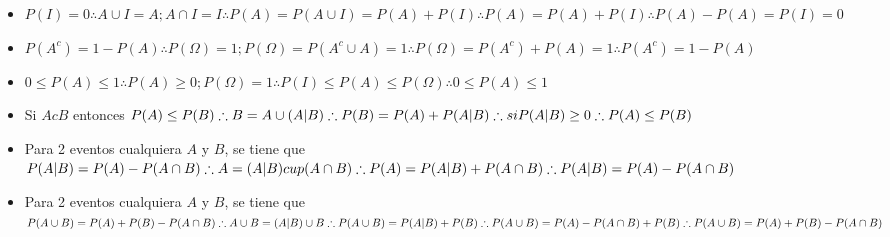 \documentclass[11pt,fleqn]{book} %
\numberwithin{equation}{section} %
\numberwithin{figure}{section} %
\numberwithin{table}{section} %
\begin{document}
\begin{itemize}
    \item $P(I) = 0 \therefore A \cup I = A; A \cap I = I \therefore P(A) = P(A \cup I) = P(A) + P(I) \therefore P(A) = P(A) + P(I) \therefore P(A) - P(A) = P(I) = 0$
    \item $P(A^{c})= 1 - P(A) \therefore P(\Omega) = 1; P(\Omega) = P(A^{c} \cup A) = 1 \therefore P(\Omega) = P(A^{c}) + P(A) = 1  \therefore P(A^{c})  = 1 - P(A)$
    \item $0 \leq P(A) \leq 1 \therefore P(A) \geq 0; P(\Omega) = 1 \therefore P(I) \leq P(A) \leq P(\Omega) \therefore 0 \leq P(A) \leq 1$
    \item Si $A c B$ entonces $P(A) \leq P(B) \therefore B = A \cup (A\arrowvert B) \therefore P(B) = P(A) + P(A\arrowvert B) \therefore si P(A\arrowvert B) \geq 0 \therefore P(A) \leq P(B)$
    \item Para 2 eventos cualquiera $A$ y $B$, se tiene que $P(A\arrowvert B) = P(A) - P(A \cap B) \therefore A = (A\arrowvert B) cup (A \cap B) \therefore P(A) = P(A\arrowvert B) + P(A \cap B) \therefore P(A\arrowvert B) = P(A) - P(A \cap B) $
    \item Para 2 eventos cualquiera $A$ y $B$, se tiene que $P(A\cup B) = P(A) + P(B) - P(A \cap B) \therefore A \cup B = (A\arrowvert B) \cup B \therefore P(A \cup B) = P(A\arrowvert B) + P(B) \therefore P(A \cup B) = P(A) - P(A \cap B) + P(B) \therefore P(A\cup B) = P(A) + P(B) - P(A \cap B)$
\end{itemize}
\end{document}
